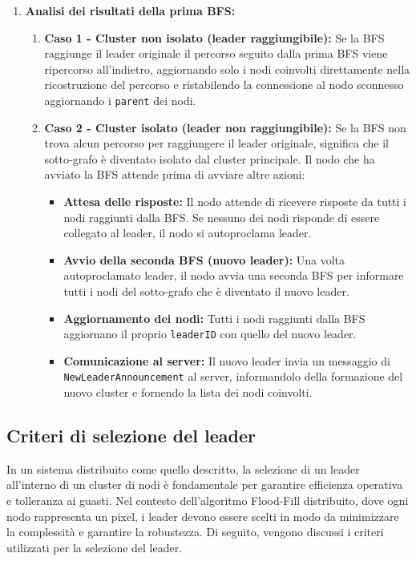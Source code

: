 \documentclass[12pt, a4paper]{report}
\begin{document}
\begin{itemize}
\begin{enumerate}
        \item \textbf{Analisi dei risultati della prima BFS:}
        \begin{enumerate}
            \item \textbf{Caso 1 - Cluster non isolato (leader raggiungibile):}
            Se la BFS raggiunge il leader originale il percorso seguito dalla prima BFS viene ripercorso all'indietro, aggiornando solo i nodi coinvolti direttamente nella ricostruzione del percorso e ristabilendo la connessione al nodo sconnesso aggiornando i \texttt{parent} dei nodi.

            \item \textbf{Caso 2 - Cluster isolato (leader non raggiungibile):}
            Se la BFS non trova alcun percorso per raggiungere il leader originale, significa che il sotto-grafo \`e diventato isolato dal cluster principale. Il nodo che ha avviato la BFS attende prima di avviare altre azioni:
            \begin{itemize}
                \item \textbf{Attesa delle risposte:} Il nodo attende di ricevere risposte da tutti i nodi raggiunti dalla BFS. Se nessuno dei nodi risponde di essere collegato al leader, il nodo si autoproclama leader.
                \item \textbf{Avvio della seconda BFS (nuovo leader):} Una volta autoproclamato leader, il nodo avvia una seconda BFS per informare tutti i nodi del sotto-grafo che \`e diventato il nuovo leader.
                \item \textbf{Aggiornamento dei nodi:} Tutti i nodi raggiunti dalla BFS aggiornano il proprio \texttt{leaderID} con quello del nuovo leader.
                \item \textbf{Comunicazione al server:} Il nuovo leader invia un messaggio di \\ \texttt{NewLeaderAnnouncement} al server, informandolo della formazione del nuovo cluster e fornendo la lista dei nodi coinvolti.
            \end{itemize}
        \end{enumerate}
    \end{enumerate}
\end{itemize}

\subsection{Criteri di selezione del leader}

In un sistema distribuito come quello descritto, la selezione di un leader all'interno di un cluster di nodi \`e fondamentale per garantire efficienza operativa e tolleranza ai guasti. Nel contesto dell'algoritmo Flood-Fill distribuito, dove ogni nodo rappresenta un pixel, i leader devono essere scelti in modo da minimizzare la complessit\`a e garantire la robustezza. Di seguito, vengono discussi i criteri utilizzati per la selezione del leader.
\end{document}
